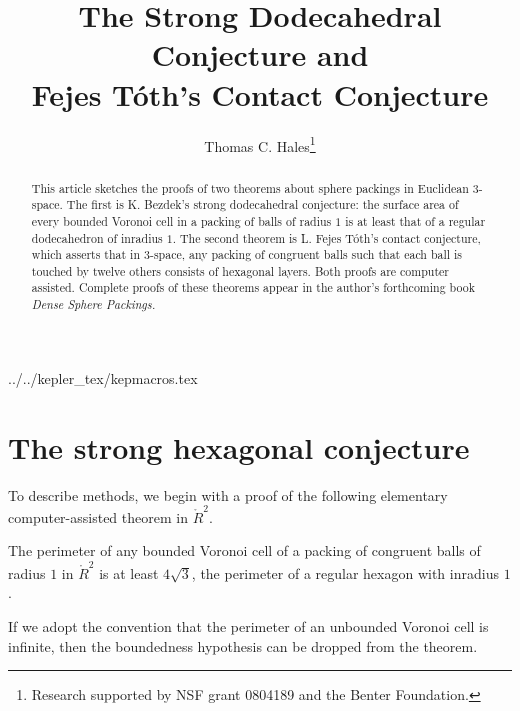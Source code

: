 \documentclass{llncs}
\begin{document}
\title{The Strong Dodecahedral Conjecture and\\ Fejes T\'oth's Contact Conjecture}
\author{Thomas C. Hales\thanks{{Research supported by 
NSF grant 0804189 and the Benter Foundation.}}}
\maketitle


\begin{abstract} This article sketches the proofs of two theorems
  about sphere packings in Euclidean $3$-space.  The first is
  K. Bezdek's strong dodecahedral conjecture: the surface area of
  every bounded Voronoi cell in a packing of balls of radius $1$ is at
  least that of a regular dodecahedron of inradius $1$.  The second
  theorem is L. Fejes T\'oth's contact conjecture, which asserts that
  in $3$-space, any packing of congruent balls such that each ball is
  touched by twelve others consists of hexagonal layers.  Both proofs
  are computer assisted.  Complete proofs of these theorems appear in
  the author's forthcoming book {\it Dense Sphere Packings.}
\end{abstract}

 {../../kepler_tex/kepmacros.tex}
\def\svninfo{{\tt
  filename: sdodec.tex\hfill\break
  PDF generated from LaTeX sources on \today; \hfill\break
  Repository Root: https://flyspeck.googlecode.com/svn \hfill\break
  SVN $LastChangedRevision$
  }
  }


\section{The strong hexagonal conjecture}

To describe methods, we begin with a proof of the following elementary
computer-assisted theorem in $\ring{R}^2$.

\begin{theorem} The perimeter of any bounded Voronoi cell of a packing
  of congruent balls of radius $1$ in $\ring{R}^2$ is at least
  $4\sqrt{3}$, the perimeter of a regular hexagon with inradius $1$.
\end{theorem}

If we adopt the convention that the perimeter of an unbounded Voronoi
cell is infinite, then the boundedness hypothesis can be dropped from
the theorem.
\end{document}

